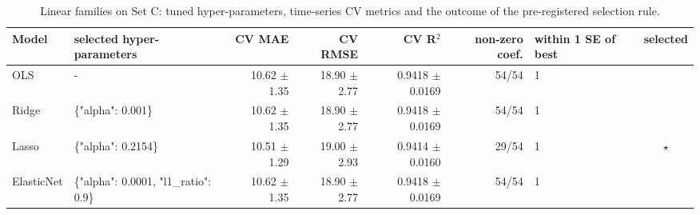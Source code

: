 \begin{table}[t]
\centering
\small
\caption{Linear families on Set C: tuned hyper-parameters, time-series CV metrics and the outcome of the pre-registered selection rule.}
\label{tab:table_S07_linear_models_cv_selection}
\begin{tabular}{llrrrrlc}
\toprule
Model & selected hyper-parameters & CV MAE & CV RMSE & CV R$^2$ & non-zero coef. & within 1 SE of best & selected \\
\midrule
OLS & - & 10.62 $\pm$ 1.35 & 18.90 $\pm$ 2.77 & 0.9418 $\pm$ 0.0169 & 54/54 & 1 &  \\
Ridge & \{"alpha": 0.001\} & 10.62 $\pm$ 1.35 & 18.90 $\pm$ 2.77 & 0.9418 $\pm$ 0.0169 & 54/54 & 1 &  \\
Lasso & \{"alpha": 0.2154\} & 10.51 $\pm$ 1.29 & 19.00 $\pm$ 2.93 & 0.9414 $\pm$ 0.0160 & 29/54 & 1 & $\star$ \\
ElasticNet & \{"alpha": 0.0001, "l1\_ratio": 0.9\} & 10.62 $\pm$ 1.35 & 18.90 $\pm$ 2.77 & 0.9418 $\pm$ 0.0169 & 54/54 & 1 &  \\
\bottomrule
\end{tabular}
\end{table}
